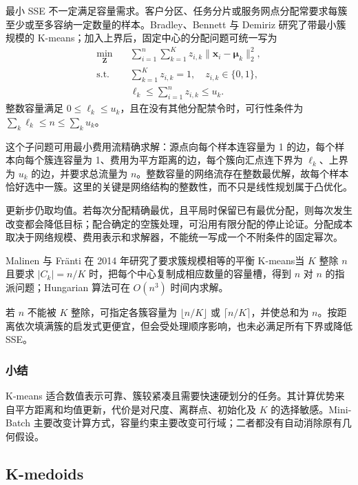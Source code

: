 最小 SSE 不一定满足容量需求。客户分区、任务分片或服务网点分配常要求每簇至少或至多容纳一定数量的样本。Bradley、Bennett 与 Demiriz 研究了带最小簇规模的 K-means；加入上界后，固定中心的分配问题可统一写为
\begin{equation}
 \begin{aligned}
 \min_{\bm{Z}}\quad&
   \sum_{i=1}^n\sum_{k=1}^K
   z_{i,k}\lVert\bm{x}_i-\bm{\mu}_k\rVert_2^2,\\
 \text{s.t.}\quad&
   \sum_{k=1}^K z_{i,k}=1,\quad z_{i,k}\in\{0,1\},\\
 & \ell_k\leq\sum_{i=1}^n z_{i,k}\leq u_k.
 \end{aligned}
 \label{eq:clustering-capacity}
\end{equation}
整数容量满足 $0\leq\ell_k\leq u_k$，且在没有其他分配禁令时，可行性条件为 $\sum_k\ell_k\leq n\leq\sum_ku_k$。

这个子问题可用最小费用流精确求解：源点向每个样本连容量为 1 的边，每个样本向每个簇连容量为 1、费用为平方距离的边，每个簇向汇点连下界为 $\ell_k$、上界为 $u_k$ 的边，并要求总流量为 $n$。整数容量的网络流存在整数最优解，故每个样本恰好选中一簇。这里的关键是网络结构的整数性，而不只是线性规划属于凸优化。

更新步仍取均值。若每次分配精确最优，且平局时保留已有最优分配，则每次发生改变都会降低目标；配合确定的空簇处理，可沿用有限分配的停止论证。分配成本取决于网络规模、费用表示和求解器，不能统一写成一个不附条件的固定幂次。

Malinen 与 Fränti 在 2014 年研究了要求簇规模相等的平衡 K-means当 $K$ 整除 $n$ 且要求 $|C_k|=n/K$ 时，把每个中心复制成相应数量的容量槽，得到 $n$ 对 $n$ 的指派问题；Hungarian 算法可在 $O(n^3)$ 时间内求解。

若 $n$ 不能被 $K$ 整除，可指定各簇容量为 $\lfloor n/K\rfloor$ 或 $\lceil n/K\rceil$，并使总和为 $n$。按距离依次填满簇的启发式更便宜，但会受处理顺序影响，也未必满足所有下界或降低 SSE。

\subsubsection{小结}

K-means 适合数值表示可靠、簇较紧凑且需要快速硬划分的任务。其计算优势来自平方距离和均值更新，代价是对尺度、离群点、初始化及 $K$ 的选择敏感。Mini-Batch 主要改变计算方式，容量约束主要改变可行域；二者都没有自动消除原有几何假设。

\subsection{K-medoids}
\label{sec:clustering-kmedoids}

